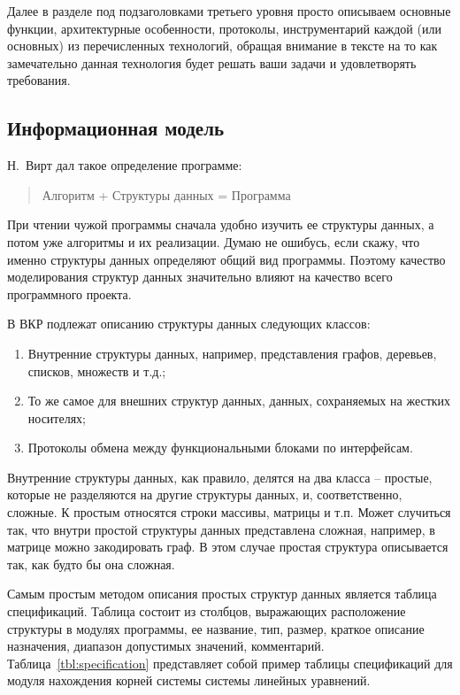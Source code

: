 \documentclass[a4paper,14pt,final]{extreport}
\begin{document}
Далее в разделе под подзаголовками третьего уровня просто описываем основные функции, архитектурные особенности, протоколы, инструментарий каждой (или основных) из перечисленных технологий, обращая внимание в тексте на то как замечательно данная технология будет решать ваши задачи и удовлетворять требования.

\subsection{Информационная модель}
\label{sec:infomod}

Н.~Вирт дал такое определение программе:
\begin{quote}
  Алгоритм + Структуры данных = Программа
\end{quote}
При чтении чужой программы сначала удобно изучить ее структуры данных, а потом уже алгоритмы и их реализации.  Думаю не ошибусь, если скажу, что именно структуры данных определяют общий вид программы.  Поэтому качество моделирования структур данных значительно влияют на качество всего программного проекта.

В ВКР подлежат описанию структуры данных следующих классов:
\begin{enumerate}
\item Внутренние структуры данных, например, представления графов, деревьев, списков, множеств и т.д.;
\item То же самое для внешних структур данных, данных, сохраняемых на жестких носителях;
\item Протоколы обмена между функциональными блоками по интерфейсам.
\end{enumerate}

Внутренние структуры данных, как правило, делятся на два класса -- простые, которые не разделяются на другие структуры данных, и, соответственно, сложные.  К простым относятся строки массивы, матрицы и т.п.  Может случиться так, что внутри простой структуры данных представлена сложная, например, в матрице можно закодировать граф.  В этом случае простая структура описывается так, как будто бы она сложная.

Самым простым методом описания простых структур данных является таблица спецификаций.  Таблица состоит из столбцов, выражающих расположение структуры в модулях программы, ее название, тип, размер, краткое описание назначения, диапазон допустимых значений, комментарий.  Таблица~\ref{tbl:specification} представляет собой пример таблицы спецификаций для модуля нахождения корней системы системы линейных уравнений.
\begin{table}[hbt]
  \centering

  \caption[Таблица спецификаций (пример)]{Таблица спецификаций модуля решения системы линейных уравнений}
  \label{tab:specification}
\end{table}
\end{document}
